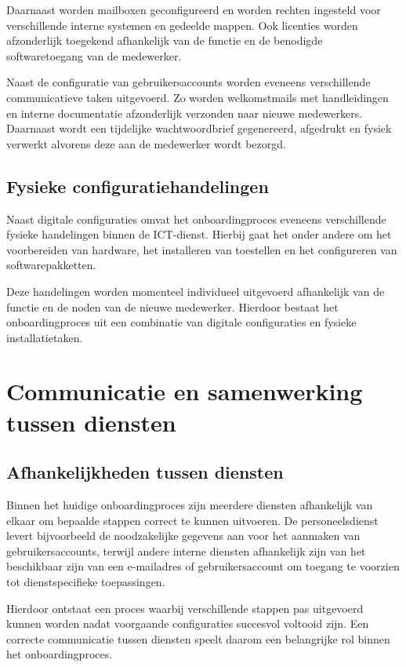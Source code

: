 Daarnaast worden mailboxen geconfigureerd en worden rechten ingesteld voor verschillende interne systemen en gedeelde mappen. Ook licenties worden afzonderlijk toegekend afhankelijk van de functie en de benodigde softwaretoegang van de medewerker.

Naast de configuratie van gebruikersaccounts worden eveneens verschillende communicatieve taken uitgevoerd. Zo worden welkomstmails met handleidingen en interne documentatie afzonderlijk verzonden naar nieuwe medewerkers. Daarnaast wordt een tijdelijke wachtwoordbrief gegenereerd, afgedrukt en fysiek verwerkt alvorens deze aan de medewerker wordt bezorgd.

\subsection{Fysieke configuratiehandelingen}

Naast digitale configuraties omvat het onboardingproces eveneens verschillende fysieke handelingen binnen de ICT-dienst. Hierbij gaat het onder andere om het voorbereiden van hardware, het installeren van toestellen en het configureren van softwarepakketten.

Deze handelingen worden momenteel individueel uitgevoerd afhankelijk van de functie en de noden van de nieuwe medewerker. Hierdoor bestaat het onboardingproces uit een combinatie van digitale configuraties en fysieke installatietaken.

\section{Communicatie en samenwerking tussen diensten}

\subsection{Afhankelijkheden tussen diensten}

Binnen het huidige onboardingproces zijn meerdere diensten afhankelijk van elkaar om bepaalde stappen correct te kunnen uitvoeren. De personeelsdienst levert bijvoorbeeld de noodzakelijke gegevens aan voor het aanmaken van gebruikersaccounts, terwijl andere interne diensten afhankelijk zijn van het beschikbaar zijn van een e-mailadres of gebruikersaccount om toegang te voorzien tot dienstspecifieke toepassingen.

Hierdoor ontstaat een proces waarbij verschillende stappen pas uitgevoerd kunnen worden nadat voorgaande configuraties succesvol voltooid zijn. Een correcte communicatie tussen diensten speelt daarom een belangrijke rol binnen het onboardingproces.

